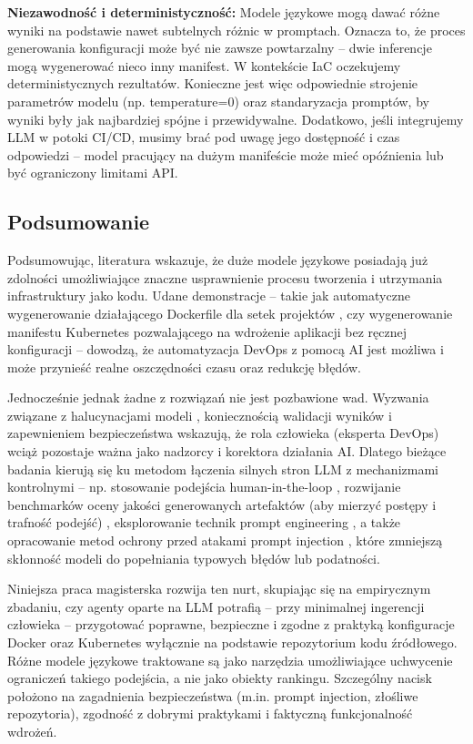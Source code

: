 \textbf{Niezawodność i deterministyczność:} Modele językowe mogą dawać różne wyniki na podstawie nawet subtelnych różnic w promptach. Oznacza to, że proces generowania konfiguracji może być nie zawsze powtarzalny – dwie inferencje mogą wygenerować nieco inny manifest. W kontekście IaC oczekujemy deterministycznych rezultatów. Konieczne jest więc odpowiednie strojenie parametrów modelu (np. temperature=0) oraz standaryzacja promptów, by wyniki były jak najbardziej spójne i przewidywalne. Dodatkowo, jeśli integrujemy LLM w potoki CI/CD, musimy brać pod uwagę jego dostępność i czas odpowiedzi – model pracujący na dużym manifeście może mieć opóźnienia lub być ograniczony limitami API.

\subsection{Podsumowanie}

Podsumowując, literatura wskazuje, że duże modele językowe posiadają już zdolności umożliwiające znaczne usprawnienie procesu tworzenia i utrzymania infrastruktury jako kodu. Udane demonstracje – takie jak automatyczne wygenerowanie działającego Dockerfile dla setek projektów \cite{hu_llm-based_2025}, czy wygenerowanie manifestu Kubernetes pozwalającego na wdrożenie aplikacji bez ręcznej konfiguracji \cite{kratzke_dont_2024} – dowodzą, że automatyzacja DevOps z pomocą AI jest możliwa i może przynieść realne oszczędności czasu oraz redukcję błędów.

Jednocześnie jednak żadne z rozwiązań nie jest pozbawione wad. Wyzwania związane z halucynacjami modeli \cite{low_repairing_2024}, koniecznością walidacji wyników \cite{ueno_migrating_2024, kon_iac-eval_nodate} i zapewnieniem bezpieczeństwa \cite{malul_genkubesec_2024, fu_security_2025} wskazują, że rola człowieka (eksperta DevOps) wciąż pozostaje ważna jako nadzorcy i korektora działania AI. Dlatego bieżące badania kierują się ku metodom łączenia silnych stron LLM z mechanizmami kontrolnymi – np. stosowanie podejścia human-in-the-loop \cite{low_repairing_2024}, rozwijanie benchmarków oceny jakości generowanych artefaktów (aby mierzyć postępy i trafność podejść) \cite{ueno_migrating_2024, kon_iac-eval_nodate}, eksplorowanie technik prompt engineering \cite{kratzke_dont_2024, pujar_invited_2023}, a także opracowanie metod ochrony przed atakami prompt injection \cite{liu_prompt_2024}, które zmniejszą skłonność modeli do popełniania typowych błędów lub podatności.

Niniejsza praca magisterska rozwija ten nurt, skupiając się na empirycznym zbadaniu, czy agenty oparte na LLM potrafią – przy minimalnej ingerencji człowieka – przygotować poprawne, bezpieczne i zgodne z praktyką konfiguracje Docker oraz Kubernetes wyłącznie na podstawie repozytorium kodu źródłowego. Różne modele językowe traktowane są jako narzędzia umożliwiające uchwycenie ograniczeń takiego podejścia, a nie jako obiekty rankingu. Szczególny nacisk położono na zagadnienia bezpieczeństwa (m.in. prompt injection, złośliwe repozytoria), zgodność z dobrymi praktykami i faktyczną funkcjonalność wdrożeń.
